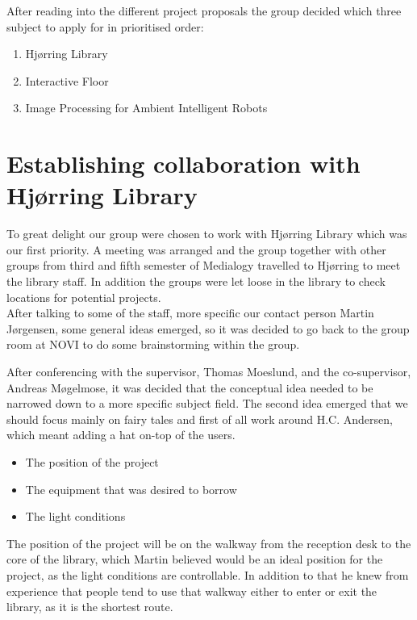 After reading into the different project proposals the group decided which three subject to apply for in prioritised order:

\begin{enumerate} 
\item Hj{\o}rring Library 
\item Interactive Floor 
\item Image Processing for Ambient Intelligent Robots 
\end{enumerate}

\section{Establishing collaboration with Hj{\o}rring Library}

To great delight our group were chosen to work with Hj{\o}rring Library which was our first priority. A meeting was arranged and the group together with other groups from third and fifth semester of Medialogy travelled to Hj{\o}rring to meet the library staff. In addition the groups were let loose in the library to check locations for potential projects.\\
After talking to some of the staff, more specific our contact person Martin J{\o}rgensen, some general ideas emerged, so it was decided to go back to the group room at NOVI to do some brainstorming within the group.


After conferencing with the supervisor, Thomas Moeslund, and the co-supervisor, Andreas Møgelmose, it was decided that the conceptual idea needed to be narrowed down to a more specific subject field. The second idea emerged that we should focus mainly on fairy tales and first of all work around H.C. Andersen, which meant adding a hat on-top of the users.


\begin{itemize}
\item The position of the project
\item The equipment that was desired to borrow
\item The light conditions
\end{itemize}

The position of the project will be on the walkway from the reception desk to the core of the library, which Martin believed would be an ideal position for the project, as the light conditions are controllable. In addition to that he knew from experience that people tend to use that walkway either to enter or exit the library, as it is the shortest route.

